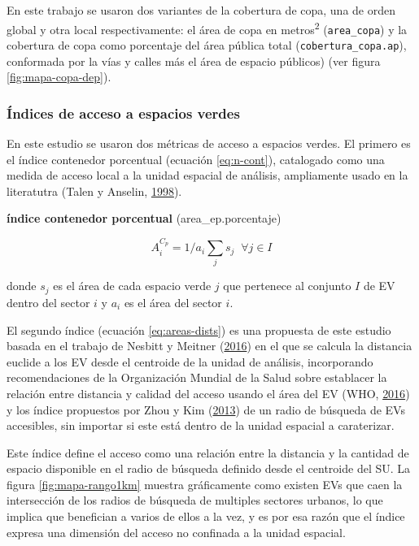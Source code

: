 \documentclass[12pt,a4paper,oneside, openany]{book}
\theoremstyle{definition}
\theoremstyle{definition}
\theoremstyle{definition}
\theoremstyle{remark}
\begin{document}
En este trabajo se usaron dos variantes de la cobertura de copa, una de
orden global y otra local respectivamente: el área de copa en
metros\textsuperscript{2} (\texttt{area\_copa}) y la cobertura de copa
como porcentaje del área pública total (\texttt{cobertura\_copa.ap}),
conformada por la vías y calles más el área de espacio públicos) (ver
figura \ref{fig:mapa-copa-dep}).

\subsubsection{Índices de acceso a espacios
verdes}\label{uxedndices-de-acceso-a-espacios-verdes}

En este estudio se usaron dos métricas de acceso a espacios verdes. El
primero es el índice contenedor porcentual (ecuación \eqref{eq:n-cont}),
catalogado como una medida de acceso local a la unidad espacial de
análisis, ampliamente usado en la literatutra (Talen y Anselin,
\protect\hyperlink{ref-talen_assessing_1998}{1998}).

\textbf{índice contenedor porcentual} (area\_ep.porcentaje)

\begin{equation}
A^{C_p}_i =1/a_i\sum_j{s_j} \;  \; \forall  j \in I
\label{eq:n-cont}
\end{equation}

donde \(s_j\) es el área de cada espacio verde \(j\) que pertenece al
conjunto \(I\) de EV dentro del sector \(i\) y \(a_i\) es el área del
sector \(i\).

El segundo índice (ecuación \eqref{eq:areas-dists}) es una propuesta de
este estudio basada en el trabajo de Nesbitt y Meitner
(\protect\hyperlink{ref-nesbitt_exploring_2016}{2016}) en el que se
calcula la distancia euclide a los EV desde el centroide de la unidad de
análisis, incorporando recomendaciones de la Organización Mundial de la
Salud sobre establacer la relación entre distancia y calidad del acceso
usando el área del EV (WHO, \protect\hyperlink{ref-who2016urban}{2016})
y los índice propuestos por Zhou y Kim
(\protect\hyperlink{ref-zhou_social_2013}{2013}) de un radio de búsqueda
de EVs accesibles, sin importar si este está dentro de la unidad
espacial a caraterizar.

Este índice define el acceso como una relación entre la distancia y la
cantidad de espacio disponible en el radio de búsqueda definido desde el
centroide del SU. La figura \ref{fig:mapa-rango1km} muestra gráficamente
como existen EVs que caen la intersección de los radios de búsqueda de
multiples sectores urbanos, lo que implica que benefician a varios de
ellos a la vez, y es por esa razón que el índice expresa una dimensión
del acceso no confinada a la unidad espacial.
\end{document}
